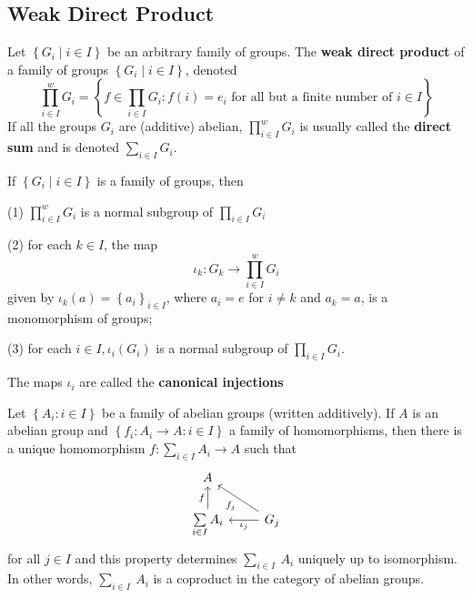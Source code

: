 \subsection{Weak Direct Product}
\begin{definition}
    Let $\left\{G_i \mid i \in I\right\}$ be an arbitrary family of groups.
    The \textbf{weak direct product} of a family of groups $\left\{G_i \mid i \in I\right\}$, denoted \begin{equation*}
        \prod_{i \in I}^w G_i
        =
        \left\{f \in \prod_{i \in I} G_i : f(i)=e_i \text{ for all but a finite number of } i \in I \right\}
    \end{equation*}
    If all the groups $G_i$ are (additive) abelian, $\prod_{i \in I}^w G_i$ is usually called the \textbf{ direct sum} and is denoted $\sum_{i \in I} G_i$.
\end{definition}


\begin{theorem}
    If $\left\{G_i \mid i \in {I}\right\}$ is a family of groups, then

    (1) $\prod_{i \in I}^w G_i$ is a normal subgroup of $\prod_{i \in I} G_i$

    (2) for each ${k} \in {I}$, the map
    \begin{equation*}
        \iota_k: G_k \rightarrow \prod_{i \in I}^w G_i
    \end{equation*}
    given by
    $\iota_k({a})=\left\{{a}_{i}\right\}_{i \in {I}}$, where ${a}_{i}={e}$
    for $i \neq {k}$ and ${a}_k={a}$, is a monomorphism of groups;

    (3) for each $i \in {I}, \iota_{i}\left(G_i\right)$ is a normal subgroup of $\prod_{i \in I} G_i$.

    The maps $\iota_i$ are called the \textbf{canonical injections}
\end{theorem}


\begin{theorem}
    Let $\left\{{A}_{i} :i \in {I}\right\}$ be a family of abelian groups (written additively).
    If $A$ is an abelian group and
    $\left\{f_i: {A}_{i} \rightarrow A : i \in {I}\right\}$
    a family of homomorphisms, then there is a unique homomorphism $f: \sum_{i \in I} A_{i} \rightarrow A$ such that
    \begin{equation*}
        \begin{tikzcd}
            A & \\
            \sum\limits_{i \in I} A_i\arrow[u,"f"]  & G_j \arrow[l,"\iota_j"]\arrow[lu,"f_j"]
        \end{tikzcd}
    \end{equation*}
    for all $j \in {I}$ and this property determines $\sum_{i \in I} {~A}_{i}$ uniquely up to isomorphism. In other words, $\sum_{i \in I} {~A}_{i}$ is a coproduct in the category of abelian groups.
\end{theorem}




